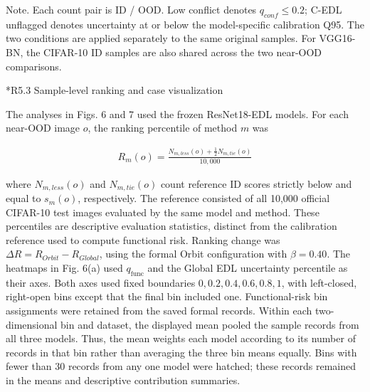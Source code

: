 \documentclass[11pt,a4paper]{article}
\makeatletter
\renewcommand\subsection{\@startsection{subsection}{2}{\z@}{-1.8ex plus -.5ex minus -.2ex}{.7ex plus .2ex}{\normalfont\normalsize\bfseries\raggedright}}
\makeatother
\begin{document}
\begingroup\footnotesize
Note. Each count pair is ID / OOD. Low conflict denotes \(q_{conf} \leq 0.2\); C-EDL unflagged denotes uncertainty at or below the model-specific calibration Q95. The two conditions are applied separately to the same original samples. For VGG16-BN, the CIFAR-10 ID samples are also shared across the two near-OOD comparisons.\par
\endgroup

\subsection*{R5.3 Sample-level ranking and case visualization}\label{s5.3-sample-level-ranking-and-case-visualization}

The analyses in Figs. 6 and 7 used the frozen ResNet18-EDL models. For each near-OOD image \(o\), the ranking percentile of method \(m\) was

\begin{equation}
\begin{array}{r}
R_{m}(o) = \frac{N_{m,less}(o) + \frac{1}{2}N_{m,tie}(o)}{10,000}
\end{array}
\label{eq:supp27}
\end{equation}

where \(N_{m,less}(o)\) and \(N_{m,tie}(o)\) count reference ID scores strictly below and equal to \(s_{m}(o)\), respectively. The reference consisted of all 10,000 official CIFAR-10 test images evaluated by the same model and method. These percentiles are descriptive evaluation statistics, distinct from the calibration reference used to compute functional risk. Ranking change was \(\Delta R = R_{Orbit} - R_{Global}\), using the formal Orbit configuration with \(\beta = 0.40\). The heatmaps in Fig. 6(a) used \(q_{\text{func}}\) and the Global EDL uncertainty percentile as their axes. Both axes used fixed boundaries \(0,0.2,0.4,0.6,0.8,1\), with left-closed, right-open bins except that the final bin included one. Functional-risk bin assignments were retained from the saved formal records. Within each two-dimensional bin and dataset, the displayed mean pooled the sample records from all three models. Thus, the mean weights each model according to its number of records in that bin rather than averaging the three bin means equally. Bins with fewer than 30 records from any one model were hatched; these records remained in the means and descriptive contribution summaries.
\end{document}
